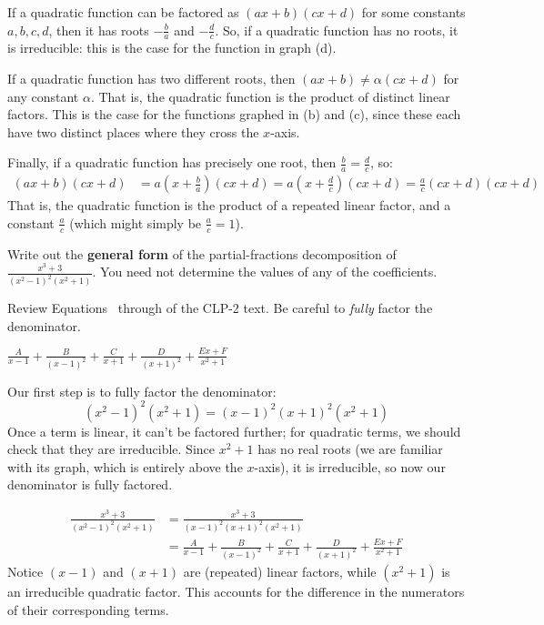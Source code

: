 \begin{solution}
If a quadratic function can be factored as $(ax+b)(cx+d)$ for some constants $ a,b,c,d$, then it has roots $-\frac{b}{a}$ and $-\frac{d}{c}$. So, if a quadratic function has no roots, it is irreducible: this is the case for the function in graph (d).

If a quadratic function has  two different roots, then $(ax+b) \neq \alpha(cx+d)$ for any constant $\alpha$. That is, the quadratic function is the product of distinct linear factors. This is the case for the functions graphed in (b) and (c), since these each have two distinct places where they cross the $x$-axis.

Finally, if a quadratic function has precisely one root, then $\frac{b}{a}=\frac{d}{c}$, so:
\begin{align*}
(ax+b)(cx+d)&=a(x+\tfrac{b}{a})(cx+d) = a(x+\tfrac{d}{c})(cx+d) = \tfrac{a}{c}(cx+d)(cx+d)
\end{align*}
That is, the quadratic function is the product of a repeated linear factor, and  a constant $\frac{a}{c}$ (which might simply be $\frac{a}{c}=1$).
\end{solution}


\begin{Mquestion}[2016Q4]
Write out the \textbf{general form} of the partial-fractions
decomposition of
$
\displaystyle\frac{x^3+3}{(x^2-1)^2(x^2+1)}
$.
You need not determine the values of any of the coefficients.
\end{Mquestion}

\begin{hint}
Review Equations~ through 
of the %
CLP-2 text.
Be careful to \emph{fully} factor the denominator.
\end{hint}

\begin{answer}
$\displaystyle\frac{A}{x-1}+\frac{B}{(x-1)^2}+\frac{C}{x+1}+\frac{D}{(x+1)^2}+\frac{Ex+F}{x^2+1} $
\end{answer}

\begin{solution}
Our first step is to fully factor the denominator:
\[(x^2-1)^2(x^2+1) = (x-1)^2(x+1)^2(x^2+1)\]
Once a term is linear, it can't be factored further; for quadratic terms, we should check that they are irreducible. Since $x^2+1$ has no real roots (we are familiar with its graph, which is entirely above the $x$-axis), it is irreducible, so now our denominator is fully factored.

\begin{align*}
\frac{x^3+3}{(x^2-1)^2(x^2+1)}
&=\frac{x^3+3}{(x-1)^2(x+1)^2(x^2+1)}\\
&=\frac{A}{x-1}+\frac{B}{(x-1)^2}+\frac{C}{x+1}+\frac{D}{(x+1)^2}+\frac{Ex+F}{x^2+1}
\end{align*}
Notice $(x-1)$ and $(x+1)$ are (repeated) linear factors, while $(x^2+1)$  is an irreducible quadratic factor. This accounts for the difference in the numerators of their corresponding terms.
\end{solution}


